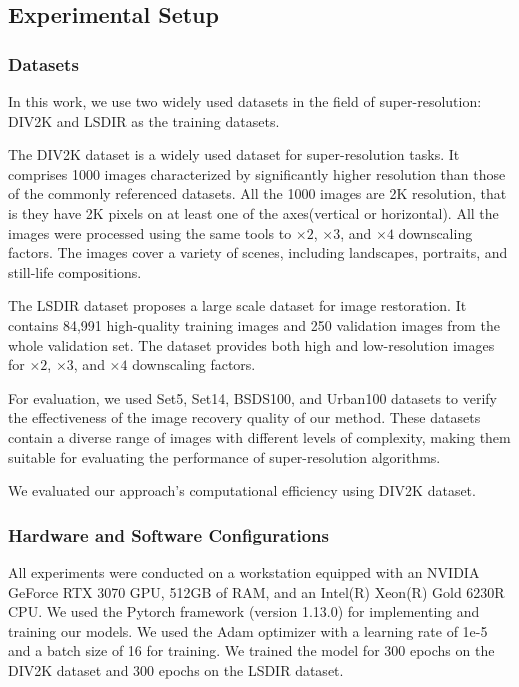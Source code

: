 \documentclass[10pt,twocolumn,letterpaper]{article}
\begin{document}
\subsection{Experimental Setup}

\subsubsection{Datasets}
In this work, we use two widely used datasets in the field of super-resolution: DIV2K\cite{div2k} and LSDIR\cite{lilsdir} as the training datasets.

The DIV2K dataset is a widely used dataset for super-resolution tasks. It comprises 1000 images characterized by significantly higher resolution than those of the commonly referenced datasets. All the 1000 images are 2K resolution, that is they have 2K pixels on at least one of the axes(vertical or horizontal). All the images were processed using the same tools to $\times2$, $\times3$, and $\times4$ downscaling factors. The images cover a variety of scenes, including landscapes, portraits, and still-life compositions.

The LSDIR dataset proposes a large scale dataset for image restoration. It contains 84,991 high-quality training images and 250 validation images from the whole validation set. The dataset provides both high and low-resolution images for $\times2$, $\times3$, and $\times4$ downscaling factors.

For evaluation, we used Set5, Set14, BSDS100, and Urban100 datasets to verify the effectiveness of the image recovery quality of our method. These datasets contain a diverse range of images with different levels of complexity, making them suitable for evaluating the performance of super-resolution algorithms.

We evaluated our approach's computational efficiency using DIV2K dataset.


\subsubsection{Hardware and Software Configurations}
All experiments were conducted on a workstation equipped with an NVIDIA GeForce RTX 3070 GPU, 512GB of RAM, and an Intel(R) Xeon(R) Gold 6230R CPU. We used the Pytorch framework (version 1.13.0) for implementing and training our models. We used the Adam optimizer with a learning rate of 1e-5 and a batch size of 16 for training. We trained the model for 300 epochs on the DIV2K dataset and 300 epochs on the LSDIR dataset.
\end{document}
